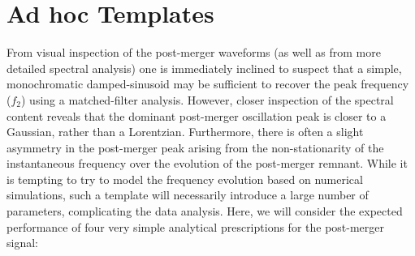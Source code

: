 \documentclass[showpacs, superscriptaddress, showpacs, letterpaper, showkeys,
preprintnumbers, altaffilletter, amssymb, amsmath, amsfonts, prd,
onecolumn, floatfix, nofootinbib]{revtex4-1}
\begin{document}

\section{Ad hoc Templates}
From visual inspection of the post-merger waveforms (as well as from more
detailed spectral analysis) one is immediately inclined to suspect that a
simple, monochromatic damped-sinusoid may be sufficient to recover the peak
frequency ($f_2$) using a matched-filter analysis.  However, closer inspection
of the spectral content reveals that the dominant post-merger oscillation peak
is closer to a Gaussian, rather than a Lorentzian.  Furthermore, there is often
a slight asymmetry in the post-merger peak arising from the non-stationarity of
the instantaneous frequency over the evolution of the post-merger remnant.
While it is tempting to try to model the frequency evolution based on numerical
simulations, such a template will necessarily introduce a large number of
parameters, complicating the data analysis.  Here, we will consider the expected
performance of four very simple analytical prescriptions for the post-merger
signal:
\end{document}
